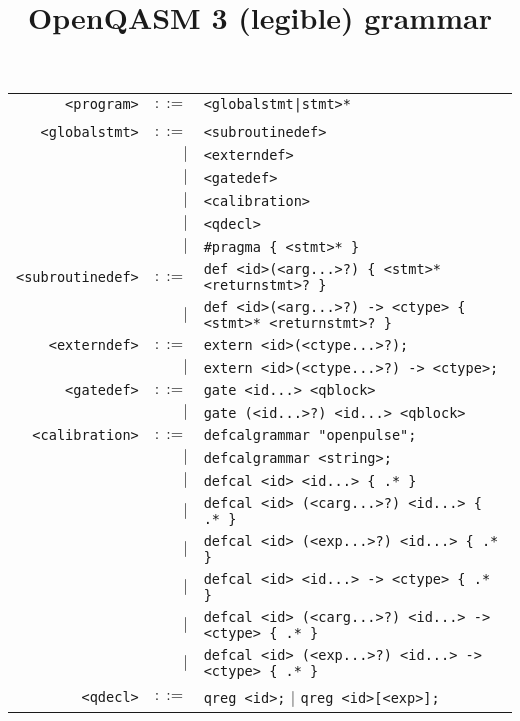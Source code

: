 \documentclass[notitlepage]{article}
\title{OpenQASM 3 (legible) grammar}
\date{\vspace{-5ex}}
\begin{document}
\maketitle

\begin{longtable}{rrl}
	\texttt{<program>} & $::=$ & \texttt{<globalstmt|stmt>*} \\ \\
	\texttt{<globalstmt>} & $::=$ & \texttt{<subroutinedef>} \\
	    & $\mid$ & \texttt{<externdef>} \\
	    & $\mid$ & \texttt{<gatedef>} \\
	    & $\mid$ & \texttt{<calibration>} \\
	    & $\mid$ & \texttt{<qdecl>} \\
	    & $\mid$ & \texttt{\#pragma \{ <stmt>* \}} \\
	\texttt{<subroutinedef>} & $::=$ & \texttt{def <id>(<arg...>?) \{ <stmt>* <returnstmt>? \}} \\
	    & $\mid$ & \texttt{def <id>(<arg...>?) -> <ctype> \{ <stmt>* <returnstmt>? \}} \\
	\texttt{<externdef>} & $::=$ & \texttt{extern <id>(<ctype...>?);} \\
	    & $\mid$ & \texttt{extern <id>(<ctype...>?) -> <ctype>;} \\
	\texttt{<gatedef>} & $::=$ & \texttt{gate <id...> <qblock>} \\
	    & $\mid$ & \texttt{gate (<id...>?) <id...> <qblock>} \\
	\texttt{<calibration>} & $::=$ & \texttt{defcalgrammar "openpulse";} \\
	    & $\mid$ & \texttt{defcalgrammar <string>;} \\
	    & $\mid$ & \texttt{defcal <id> <id...> \{ .* \}} \\
	    & $\mid$ & \texttt{defcal <id> (<carg...>?) <id...> \{ .* \}} \\
	    & $\mid$ & \texttt{defcal <id> (<exp...>?) <id...> \{ .* \}} \\
	    & $\mid$ & \texttt{defcal <id> <id...> -> <ctype> \{ .* \}} \\
	    & $\mid$ & \texttt{defcal <id> (<carg...>?) <id...> -> <ctype> \{ .* \}} \\
	    & $\mid$ & \texttt{defcal <id> (<exp...>?) <id...> -> <ctype> \{ .* \}} \\
	\texttt{<qdecl>} & $::=$ & \texttt{qreg <id>;} $\mid$ \texttt{qreg <id>[<exp>];} \\

\end{longtable}
\end{document}
